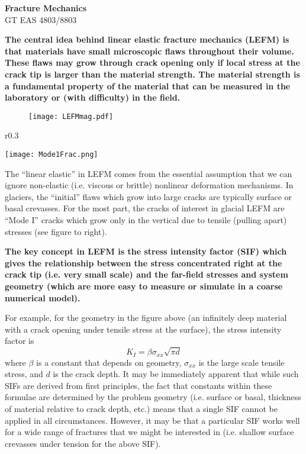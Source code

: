 \documentclass[12pt]{article}
\theoremstyle{definition}
\begin{document}
\thispagestyle{empty}

\begin{center}
{\LARGE \bf Fracture Mechanics}\\
{\large GT EAS 4803/8803}\\
\end{center}

\textbf{The central idea behind linear elastic fracture mechanics (LEFM) is that materials have small microscopic flaws throughout their volume. These flaws may grow through crack opening only if local stress at the crack tip is larger than the material strength. The material strength is a fundamental property of the material that can be measured in the laboratory or (with difficulty) in the field.}

\begin{figure}[h]
  \begin{center}
\texttt{[image: LEFMmag.pdf]}
  \end{center}
\end{figure}

\begin{wrapfigure}{r}{0.3\textwidth}
  \begin{center}
\texttt{[image: Mode1Frac.png]}
  \end{center}
  \vspace{-20pt}
\end{wrapfigure}
The ``linear elastic'' in LEFM comes from the essential assumption that we can ignore non-elastic (i.e. viscous or brittle) nonlinear deformation mechanisms. In glaciers, the ``initial'' flaws which grow into large cracks are typically surface or basal crevasses. For the most part, the cracks of interest in glacial LEFM are ``Mode I'' cracks which grow only in the vertical due to tensile (pulling apart) stresses (see figure to right).

\textbf{The key concept in LEFM is the stress intensity factor (SIF) which gives the relationship between the stress concentrated right at the crack tip (i.e. very small scale) and the far-field stresses and system geometry (which are more easy to measure or simulate in a coarse numerical model).}

For example, for the geometry in the figure above (an infinitely deep material with a crack opening under tensile stress at the surface), the stress intensity factor is
\begin{equation}
K_I = \beta \sigma_{xx} \sqrt{\pi d}
\end{equation}
where $\beta$ is a constant that depends on geometry, $\sigma_{xx}$ is the large scale tensile stress, and $d$ is the crack depth. It may be immediately apparent that while such SIFs are derived from first principles, the fact that constants within these formulae are determined by the problem geometry (i.e. surface or basal, thickness of material relative to crack depth, etc.) means that a single SIF cannot be applied in all circumstances. However, it may be that a particular SIF works well for a wide range of fractures that we might be interested in (i.e. shallow surface crevasses under tension for the above SIF).
\end{document}
